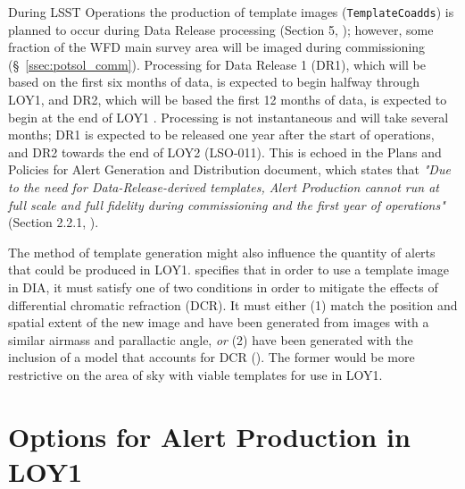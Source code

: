 \documentclass[DM,toc]{lsstdoc}
\begin{document}
During LSST Operations the production of template images ({\tt TemplateCoadds}) is planned to occur during Data Release processing (Section 5, ); however, some fraction of the WFD main survey area will be imaged during commissioning (\S~\ref{ssec:potsol_comm}).
Processing for Data Release 1 (DR1), which will be based on the first six months of data, is expected to begin halfway through LOY1, and DR2, which will be based the first 12 months of data, is expected to begin at the end of LOY1 .
Processing is not instantaneous and will take several months; DR1 is expected to be released one year after the start of operations, and DR2 towards the end of LOY2 (LSO-011).
This is echoed in the Plans and Policies for Alert Generation and Distribution document, which states that {\it "Due to the need for Data-Release-derived templates, Alert Production cannot run at full scale and full fidelity during commissioning and the first year of operations"} (Section 2.2.1, ).

The method of template generation might also influence the quantity of alerts that could be produced in LOY1.
 specifies that in order to use a template image in DIA, it must satisfy one of two conditions in order to mitigate the effects of differential chromatic refraction (DCR).
It must either (1) match the position and spatial extent of the new image and have been generated from images with a similar airmass and parallactic angle, {\em or} (2) have been generated with the inclusion of a model that accounts for DCR ().
The former would be more restrictive on the area of sky with viable templates for use in LOY1.

\clearpage
\section{Options for Alert Production in LOY1}\label{sec:potsol}
\end{document}
